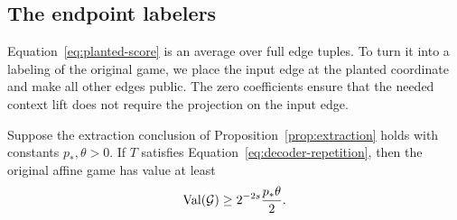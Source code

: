 \subsection{The endpoint labelers}

Equation~\eqref{eq:planted-score} is an average over full edge tuples.
To turn it into a labeling of the original game, we place the input edge
at the planted coordinate and make all other edges public.  The zero
coefficients ensure that the needed context lift does not require the
projection on the input edge.

\begin{proposition}[Decoding]\label{prop:decoding}
Suppose the extraction conclusion of Proposition~\ref{prop:extraction}
holds with constants $p_*,\theta>0$.  If $T$ satisfies
Equation~\eqref{eq:decoder-repetition}, then the original affine
game has value at least
\begin{equation}\label{eq:decoded-value}
 \operatorname{Val}(\mathcal G)\geq 2^{-2s}\frac{p_*\theta}{2}.
\end{equation}
\end{proposition}

